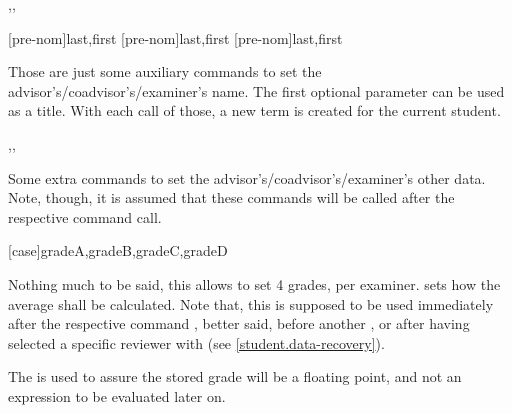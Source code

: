 \documentclass[10pt]{article}
\begin{document}

\begin{codedescribe}{\advisor,\coadvisor,\examiner}
  \begin{codesyntax}
    \tsmacro{\advisor}[pre-nom]{last,first}
    \tsmacro{\coadvisor}[pre-nom]{last,first}
    \tsmacro{\examiner}[pre-nom]{last,first}
  \end{codesyntax}
  Those are just some auxiliary commands to set the advisor's/coadvisor's/examiner's name. The first optional parameter  can be used as a title. With each call of those, a new  term is created for the current student.
\end{codedescribe}


\begin{codedescribe}{\advisorinfo,\coadvisorinfo,\examinerinfo}
  \begin{codesyntax}
  \end{codesyntax}
  Some extra commands to set the advisor's/coadvisor's/examiner's other data. Note, though, it is assumed that these commands will be called after the respective \tsobj[code,sep=or]{\advisor,\coadvisor,\examiner} command call.
\end{codedescribe}



\begin{codedescribe}{\examinergrades}
\begin{codesyntax}
  \tsmacro{\examinergrades}[case]{gradeA,gradeB,gradeC,gradeD}
\end{codesyntax}  
Nothing much to be said, this allows to set 4 grades, per examiner.  sets how the average shall be calculated. Note that, this is supposed to be used immediately  after the respective command \tsobj{\examiner}, better said, before another \tsobj{\examiner}, or after having selected a specific reviewer with \tsobj{\studentreviewerselect} (see \ref{student.data-recovery}).
\begin{tsremark}
  The  is used to assure the stored grade will be a floating point, and not an expression to be evaluated later on.
\end{tsremark}
\end{codedescribe}
\end{document}
